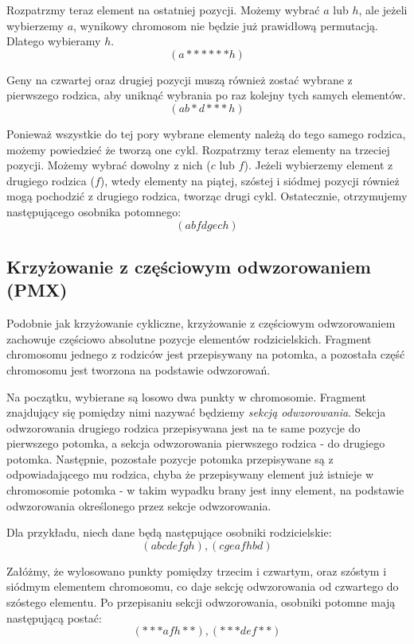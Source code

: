 \documentclass{xmgr}
\begin{document}
Rozpatrzmy teraz element na ostatniej pozycji. Możemy wybrać $a$ lub $h$, ale jeżeli wybierzemy $a$, wynikowy chromosom nie będzie już prawidłową permutacją. Dlatego wybieramy $h$.
$$ (a * * * * * * h) $$

Geny na czwartej oraz drugiej pozycji muszą również zostać wybrane z pierwszego rodzica, aby uniknąć wybrania po raz kolejny tych samych elementów.
$$ (a b * d * * * h) $$

Ponieważ wszystkie do tej pory wybrane elementy należą do tego samego rodzica, możemy powiedzieć że tworzą one cykl. Rozpatrzmy teraz elementy na trzeciej pozycji. Możemy wybrać dowolny z nich ($c$ lub $f$). Jeżeli wybierzemy element z drugiego rodzica ($f$), wtedy elementy na piątej, szóstej i siódmej pozycji również mogą pochodzić z drugiego rodzica, tworząc drugi cykl. Ostatecznie, otrzymujemy następującego osobnika potomnego:
$$ (a b f d g e c h) $$


\subsection{Krzyżowanie z częściowym odwzorowaniem (PMX)}

Podobnie jak krzyżowanie cykliczne, krzyżowanie z częściowym odwzorowaniem~\cite{GoldbergLingle} zachowuje częściowo absolutne pozycje elementów rodzicielskich. Fragment chromosomu jednego z rodziców jest przepisywany na potomka, a pozostała część chromosomu jest tworzona na podstawie odwzorowań.

Na początku, wybierane są losowo dwa punkty w chromosomie. Fragment znajdujący się pomiędzy nimi nazywać będziemy \emph{sekcją odwzorowania}. Sekcja odwzorowania drugiego rodzica przepisywana jest na te same pozycje do pierwszego potomka, a sekcja odwzorowania pierwszego rodzica - do drugiego potomka. Następnie, pozostałe pozycje potomka przepisywane są z odpowiadającego mu rodzica, chyba że przepisywany element już istnieje w chromosomie potomka - w takim wypadku brany jest inny element, na podstawie odwzorowania określonego przez sekcje odwzorowania.

Dla przykładu, niech dane będą następujące osobniki rodzicielskie:
$$ (a b c d e f g h), (c g e a f h b d) $$

Załóżmy, że wylosowano punkty pomiędzy trzecim i czwartym, oraz szóstym i siódmym elementem chromosomu, co daje sekcję odwzorowania od czwartego do szóstego elementu. Po przepisaniu sekcji odwzorowania, osobniki potomne mają następującą postać:
$$ (* * * a f h * *), (* * * d e f * *) $$
\end{document}
